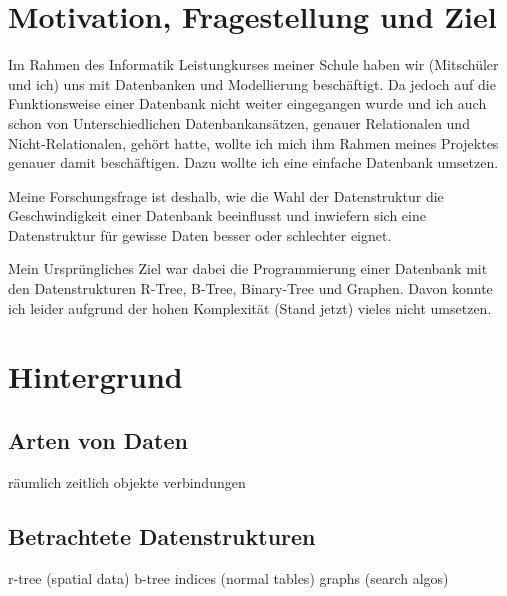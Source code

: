 \documentclass[11pt,a4paper]{article}
\begin{document}

\renewcommand*\contentsname{Inhaltsverzeichnis}

\renewcommand{\cftdot}{}

\tableofcontents

\clearpage

\pagestyle{plain}

\section{Motivation, Fragestellung und Ziel}

Im Rahmen des Informatik Leistungkurses meiner Schule haben wir (Mitschüler und ich) uns
mit Datenbanken und Modellierung beschäftigt. Da jedoch auf die Funktionsweise einer
Datenbank nicht weiter eingegangen wurde und ich auch schon von Unterschiedlichen
Datenbankansätzen, genauer Relationalen und Nicht-Relationalen, gehört hatte,
wollte ich mich ihm Rahmen meines Projektes genauer damit beschäftigen.
Dazu wollte ich eine einfache Datenbank umsetzen.\newline

Meine Forschungsfrage ist deshalb, wie die Wahl der Datenstruktur die
Geschwindigkeit einer Datenbank beeinflusst und inwiefern sich eine Datenstruktur
für gewisse Daten besser oder schlechter eignet.\newline

Mein Ursprüngliches Ziel war dabei die Programmierung einer Datenbank
mit den Datenstrukturen R-Tree, B-Tree, Binary-Tree und Graphen.
Davon konnte ich leider aufgrund der hohen Komplexität (Stand jetzt) vieles nicht umsetzen.

\section{Hintergrund}

\subsection{Arten von Daten}



räumlich
zeitlich
objekte
verbindungen

\subsection{Betrachtete Datenstrukturen}

r-tree (spatial data)
b-tree
indices (normal tables)
graphs (search algos)
\end{document}
